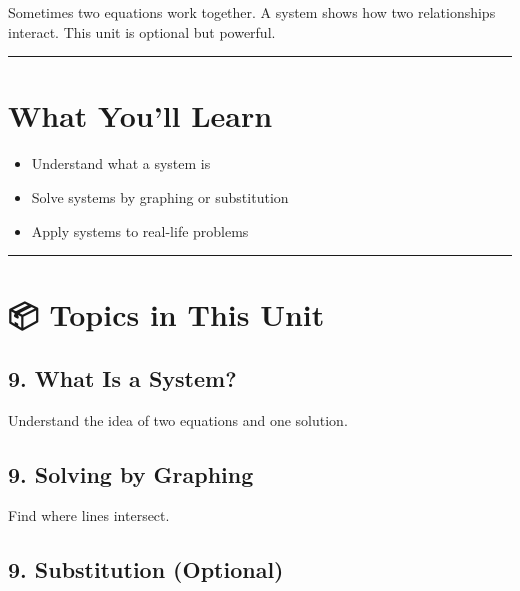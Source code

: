 \documentclass[
  letterpaper,
]{scrrept}
\providecommand{\tightlist}{%
  \setlength{\itemsep}{0pt}\setlength{\parskip}{0pt}}
\begin{document}
Sometimes two equations work together. A system shows how two
relationships interact. This unit is optional but powerful.

\begin{center}\rule{0.5\linewidth}{0.5pt}\end{center}

\section*{What You'll Learn}\label{what-youll-learn-7}


\begin{itemize}
\tightlist
\item
  Understand what a system is
\item
  Solve systems by graphing or substitution
\item
  Apply systems to real-life problems
\end{itemize}

\begin{center}\rule{0.5\linewidth}{0.5pt}\end{center}

\section*{📦 Topics in This Unit}\label{topics-in-this-unit-7}


\subsection*{9. What Is a System?}\label{what-is-a-system}

Understand the idea of two equations and one solution.

\subsection*{9. Solving by Graphing}\label{solving-by-graphing}

Find where lines intersect.

\subsection*{9. Substitution (Optional)}\label{substitution-optional}
\end{document}
